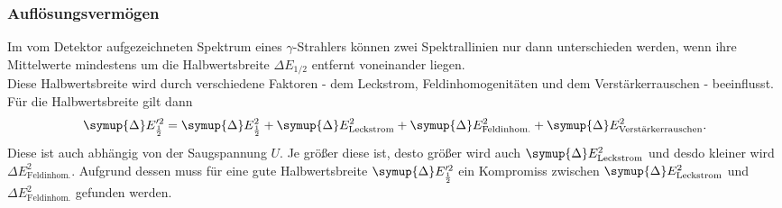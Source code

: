 \subsubsection{Auflösungsvermögen}
Im vom Detektor aufgezeichneten Spektrum eines $\gamma$-Strahlers können zwei Spektrallinien
nur dann unterschieden werden, wenn ihre Mittelwerte mindestens um die Halbwertsbreite
$\Delta E_{1/2}$ entfernt voneinander liegen. \\
Diese Halbwertsbreite wird durch verschiedene Faktoren - dem Leckstrom, Feldinhomogenitäten und dem Verstärkerrauschen - beeinflusst. Für die Halbwertsbreite gilt dann
\begin{equation}
    \symup{\Delta}E'^2_{\frac{1}{2}} = \symup{\Delta}E^2_{\frac{1}{2}} + \symup{\Delta}E^2_\text{Leckstrom} + \symup{\Delta}E^2_\text{Feldinhom.} + \symup{\Delta}E^2_\text{Verstärkerrauschen}.
\end{equation}
Diese ist auch abhängig von der Saugspannung $U$. Je größer diese ist, desto größer wird auch $\symup{\Delta}E^2_\text{Leckstrom}$ und desdo kleiner wird ${\Delta}E^2_\text{Feldinhom.}$. Aufgrund dessen muss für eine gute Halbwertsbreite $\symup{\Delta}E'^2_{\frac{1}{2}}$ ein Kompromiss zwischen $\symup{\Delta}E^2_\text{Leckstrom}$ und ${\Delta}E^2_\text{Feldinhom.}$ gefunden werden.

